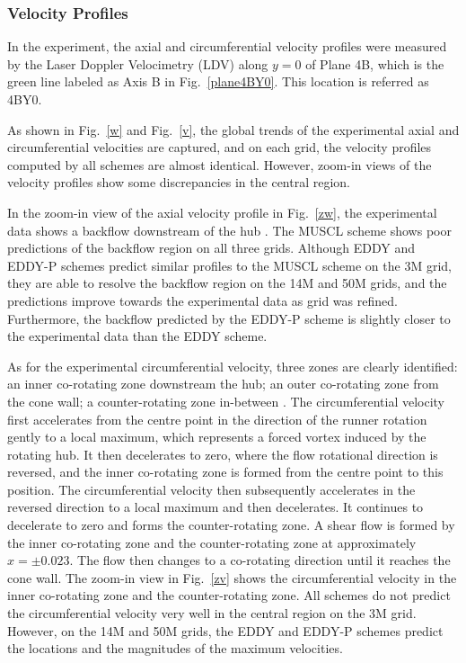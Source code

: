 \subsubsection{Velocity Profiles}
In the experiment, the axial and circumferential velocity profiles were measured by the Laser Doppler Velocimetry (LDV) along $y=0$ of Plane 4B, which is the green line labeled as Axis B in Fig.~\ref{plane4BY0}. This location is referred as 4BY0.

As shown in Fig.~\ref{w} and Fig.~\ref{v}, the global trends of the experimental axial and circumferential velocities are captured, and on each grid, the velocity profiles computed by all schemes are almost identical. However, zoom-in views of the velocity profiles show some discrepancies in the central region. 

In the zoom-in view of the axial velocity profile in Fig.~\ref{zw}, the experimental data shows a backflow downstream of the hub \cite{vuillemard2014experimental}. The MUSCL scheme shows poor predictions of the backflow region on all three grids. Although EDDY and EDDY-P schemes predict similar profiles to the MUSCL scheme on the 3M grid, they are able to resolve the backflow region on the 14M and 50M grids, and the predictions improve towards the experimental data as grid was refined. Furthermore, the backflow predicted by the EDDY-P scheme is slightly closer to the experimental data than the EDDY scheme.

As for the experimental circumferential velocity, three zones are clearly identified: an inner co-rotating zone downstream the hub; an outer co-rotating zone from the cone wall; a counter-rotating zone in-between \cite{vuillemard2014experimental}. The circumferential velocity first accelerates from the centre point in the direction of the runner rotation gently to a local maximum, which represents a forced vortex induced by the rotating hub. It then decelerates to zero, where the flow rotational direction is reversed, and the inner co-rotating zone is formed from the centre point to this position. The circumferential velocity then subsequently accelerates in the reversed direction to a local maximum and then decelerates. It continues to decelerate to zero and forms the counter-rotating zone.  A shear flow is formed by the inner co-rotating zone and the counter-rotating zone at approximately $x=\pm 0.023$. The flow then changes to a co-rotating direction until it reaches the cone wall. The zoom-in view in Fig.~\ref{zv} shows the circumferential velocity in the inner co-rotating zone and the counter-rotating zone. All schemes do not predict the circumferential velocity very well in the central region on the 3M grid. However, on the 14M and 50M grids, the EDDY and EDDY-P schemes predict the locations and the magnitudes of the maximum velocities.

